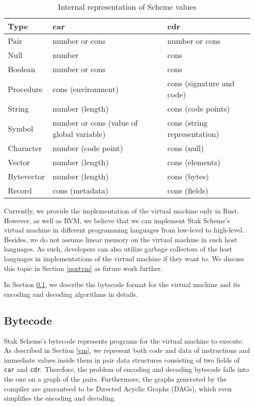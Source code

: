 \documentclass[sigplan, anonymous, review]{acmart}
\begin{document}
\begin{table*}
  \begin{center}
    \caption{Internal representation of Scheme values}
    \label{table:types}
    \begin{tabular}{lll}
      \hline
      Type & car & cdr \\
      \hline
      Pair & number or cons & number or cons \\
      Null & number & cons \\
      Boolean & number or cons & cons \\
      Procedure & cons (environment) & cons (signature and code) \\
      String & number (length) & cons (code points) \\
      Symbol & number or cons (value of global variable) & cons
      (string representation) \\
      Character & number (code point) & cons (null) \\
      Vector & number (length) & cons (elements) \\
      Bytevector & number (length) & cons (bytes) \\
      Record & cons (metadata) & cons (fields) \\
      \hline
    \end{tabular}
  \end{center}
\end{table*}

Currently, we provide the implementation of the virtual machine only
in Rust.
However, as well as RVM, we believe that we can implement Stak Scheme's
virtual machine in different programming languages from low-level to high-level.
Besides, we do not assume linear memory on the virtual machine in such
host languages.
As such, developers can also utilize garbage collectors of
the host languages in implementations of the virtual machine if they want to.
We discuss this topic in Section \ref{portvm} as future work further.

In Section \ref{bytecode}, we describe the bytecode format for the
virtual machine and its encoding and decoding algorithms in details.

\subsection{Bytecode} \label{bytecode}

Stak Scheme's bytecode represents programs for the virtual machine to execute.
As described in Section \ref{vm},
we represent both code and data of instructions and immediate
values inside them in pair data structures consisting of two fields of
\texttt{car} and \texttt{cdr}.
Therefore, the problem of encoding and decoding bytecode falls into
the one on a graph of the pairs.
Furthermore, the graphs generated by the compiler are guaranteed to be
Directed Acyclic Graphs (DAGs), which even simplifies the encoding
and decoding.
\end{document}
